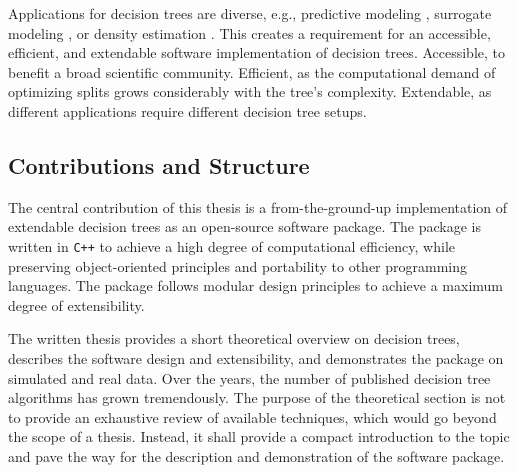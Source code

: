 \documentclass[a4paper, 11pt]{article}
\begin{document}
\par
Applications for decision trees are diverse, e.g., predictive modeling \cite{hastie_elemstatlearn}, surrogate modeling \cite{schaaf_surrogate_tree}, or density estimation \cite{ram_density_estimation_tree}. This creates a requirement for an accessible, efficient, and extendable software implementation of decision trees. Accessible, to benefit a broad scientific community. Efficient, as the computational demand of optimizing splits grows considerably with the tree's complexity. Extendable, as different applications require different decision tree setups.
\par

\subsection{Contributions and Structure} The central contribution of this thesis is a from-the-ground-up implementation of extendable decision trees as an open-source software package. The package is written in \texttt{C++} to achieve a high degree of computational efficiency, while preserving object-oriented principles and portability to other programming languages. The package follows modular design principles to achieve a maximum degree of extensibility.
\par
The written thesis provides a short theoretical overview on decision trees, describes the software design and extensibility, and demonstrates the package on simulated and real data. Over the years, the number of published decision tree algorithms has grown tremendously. The purpose of the theoretical section is not to provide an exhaustive review of available techniques, which would go beyond the scope of a thesis. Instead, it shall provide a compact introduction to the topic and pave the way for the description and demonstration of the software package.
\end{document}
